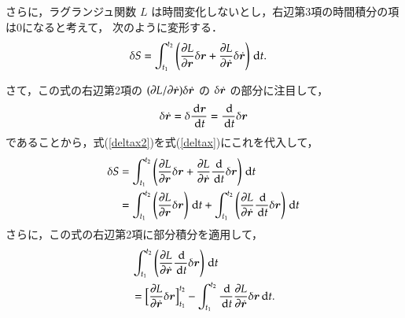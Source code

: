             さらに，ラグランジュ関数 $L$ は時間変化しないとし，右辺第3項の時間積分の項は0になると考えて，
            次のように変形する．
                \begin{align}\label{deltax}
                                \delta S&= \int_{t_{1}}^{t_{2}}\left(
                                          \frac{\rd L}{\rd \br}\delta \br
                                          +\frac{\rd L}{\rd \dot{\br}}\delta\dot{\br}
                                          \right) \df t.
                \end{align}

            さて，この式の右辺第2項の $(\partial L/\partial \dot{\boldsymbol{r}})\delta\dot{\boldsymbol{r}}$ の $\delta\dot{\boldsymbol{r}}$ の部分に注目して，
                \begin{align}\label{deltax2}
                    \delta\dot{\br}=\delta\frac{\df\br}{\df t}=\frac{\df }{\df t}\delta \br
                \end{align}
            であることから，式(\ref{deltax2})を式(\ref{deltax})にこれを代入して，
                \begin{align}\label{eq:deltax3}
                    \delta S&=  \int_{t_{1}}^{t_{2}}\left(
                                            \frac{\rd L}{\rd \br}\delta \br
                                                +\frac{\rd L}{\rd \dot{\br}}\frac{\df }{\df t}\delta \br
                                            \right) \df t \notag \\
                                                        &=  \int_{t_{1}}^{t_{2}}
                                                            \left( \frac{\rd L}{\rd \br}\delta \br \right) \df t
                                                           +\int_{t_{1}}^{t_{2}}
                                                            \left( \frac{\rd L}{\rd \dot{\br}}\frac{\df }{\df t}\delta \br \right) \df t
                \end{align}
            さらに，この式の右辺第2項に部分積分を適用して，
                \begin{align*}
                                \mbox{}
                        &  \int_{t_{1}}^{t_{2}} \left( \frac{\partial L}{\partial \dot{\boldsymbol{r}}}\frac{\,\mathrm{d} }{\,\mathrm{d} t}\delta \boldsymbol{r} \right) \,\mathrm{d} t \\
                    &= \Bigl[\frac{\partial L}{\partial\dot{\boldsymbol{r}}}\delta \boldsymbol{r}\Bigr]_{t_{1}}^{t_{2}}
                      -\int_{t_{1}}^{t_{2}}\frac{\,\mathrm{d} }{\,\mathrm{d} t} \frac{\partial L}{\partial \dot{\boldsymbol{r}}} \delta \boldsymbol{r}\,\mathrm{d} t.
                \end{align*}

